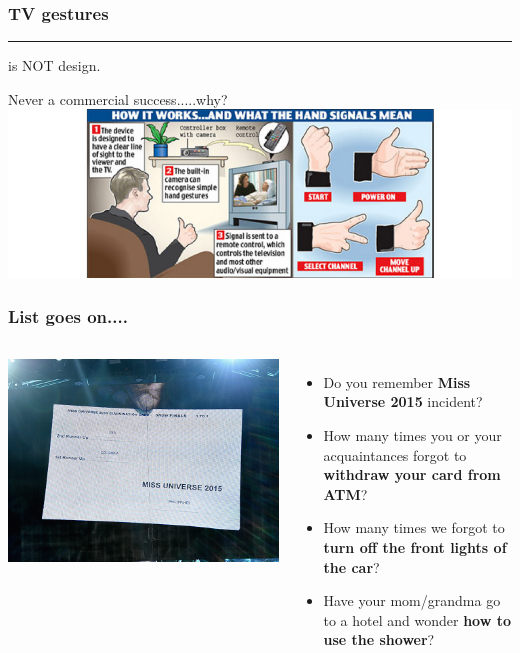 \documentclass{beamer}
\begin{document}
\begin{frame}
\frametitle{TV gestures}
\begin{center}
\rule{2cm}{0.15mm} is NOT design. 
\end{center}
\centering
Never a commercial success.....why?
\newline \newline
\includegraphics[width=1\linewidth]{tvgestures}
\end{frame}

\begin{frame}
\frametitle{List goes on....}
\begin{columns}[c] %
	
	\centering
	\includegraphics[width=1\linewidth]{universe}\newline
	
	\begin{itemize}
		\item Do you remember \textbf{Miss Universe 2015} incident?
		\item How many times you or your acquaintances forgot to \textbf{withdraw your card from ATM}?
		\item How many times we forgot to \textbf{turn off the front lights of the car}?
		\item Have your mom/grandma go to a hotel and wonder \textbf{how to use the shower}?
	\end{itemize}
\end{columns}
\end{frame}
\end{document}
